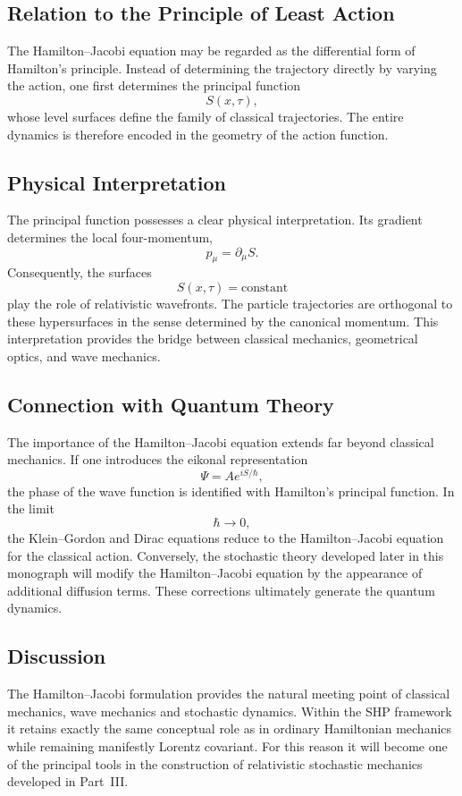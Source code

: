 \subsection{Relation to the Principle of Least Action}
The Hamilton--Jacobi equation may be regarded as the differential form of
Hamilton's principle.
Instead of determining the trajectory directly by varying the action,
one first determines the principal function
\[S(x,\tau),\]
whose level surfaces define the family of classical trajectories.
The entire dynamics is therefore encoded in the geometry of the action
function.
\subsection{Physical Interpretation}
The principal function possesses a clear physical interpretation.
Its gradient determines the local four-momentum,
\[p_\mu=\partial_\mu S.\]
Consequently, the surfaces
\[S(x,\tau)=\mathrm{constant}\]
play the role of relativistic wavefronts.
The particle trajectories are orthogonal to these hypersurfaces in the
sense determined by the canonical momentum.
This interpretation provides the bridge between classical mechanics,
geometrical optics, and wave mechanics.
\subsection{Connection with Quantum Theory}
The importance of the Hamilton--Jacobi equation extends far beyond
classical mechanics.
If one introduces the eikonal representation
\[\Psi=A e^{iS/\hbar},\]
the phase of the wave function is identified with Hamilton's principal
function.
In the limit
\[\hbar\rightarrow 0,\]
the Klein--Gordon and Dirac equations reduce to the Hamilton--Jacobi
equation for the classical action.
Conversely, the stochastic theory developed later in this monograph will
modify the Hamilton--Jacobi equation by the appearance of additional
diffusion terms.
These corrections ultimately generate the quantum dynamics.
\subsection{Discussion}
The Hamilton--Jacobi formulation provides the natural meeting point of
classical mechanics, wave mechanics and stochastic dynamics.
Within the SHP framework it retains exactly the same conceptual role as
in ordinary Hamiltonian mechanics while remaining manifestly Lorentz
covariant.
For this reason it will become one of the principal tools in the
construction of relativistic stochastic mechanics developed in Part~III.

